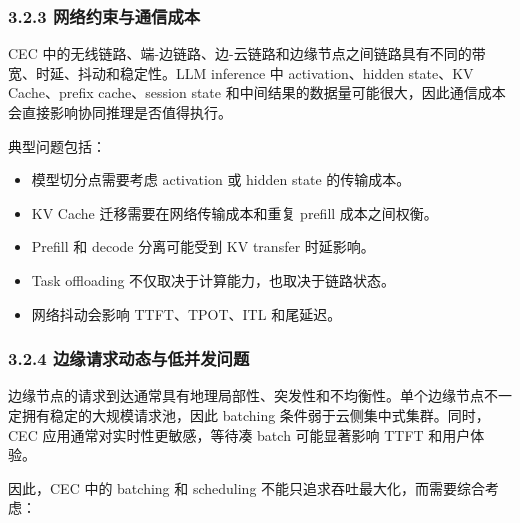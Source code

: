 \documentclass[a4paper,10pt]{ctexart}
\begin{document}
\subsubsection*{3.2.3 网络约束与通信成本}



CEC 中的无线链路、端-边链路、边-云链路和边缘节点之间链路具有不同的带宽、时延、抖动和稳定性。LLM inference 中 activation、hidden state、KV Cache、prefix cache、session state 和中间结果的数据量可能很大，因此通信成本会直接影响协同推理是否值得执行。




典型问题包括：




\begin{itemize}
\item 模型切分点需要考虑 activation 或 hidden state 的传输成本。

\item KV Cache 迁移需要在网络传输成本和重复 prefill 成本之间权衡。

\item Prefill 和 decode 分离可能受到 KV transfer 时延影响。

\item Task offloading 不仅取决于计算能力，也取决于链路状态。

\item 网络抖动会影响 TTFT、TPOT、ITL 和尾延迟。



\end{itemize}




\subsubsection*{3.2.4 边缘请求动态与低并发问题}



边缘节点的请求到达通常具有地理局部性、突发性和不均衡性。单个边缘节点不一定拥有稳定的大规模请求池，因此 batching 条件弱于云侧集中式集群。同时，CEC 应用通常对实时性更敏感，等待凑 batch 可能显著影响 TTFT 和用户体验。




因此，CEC 中的 batching 和 scheduling 不能只追求吞吐最大化，而需要综合考虑：
\end{document}
